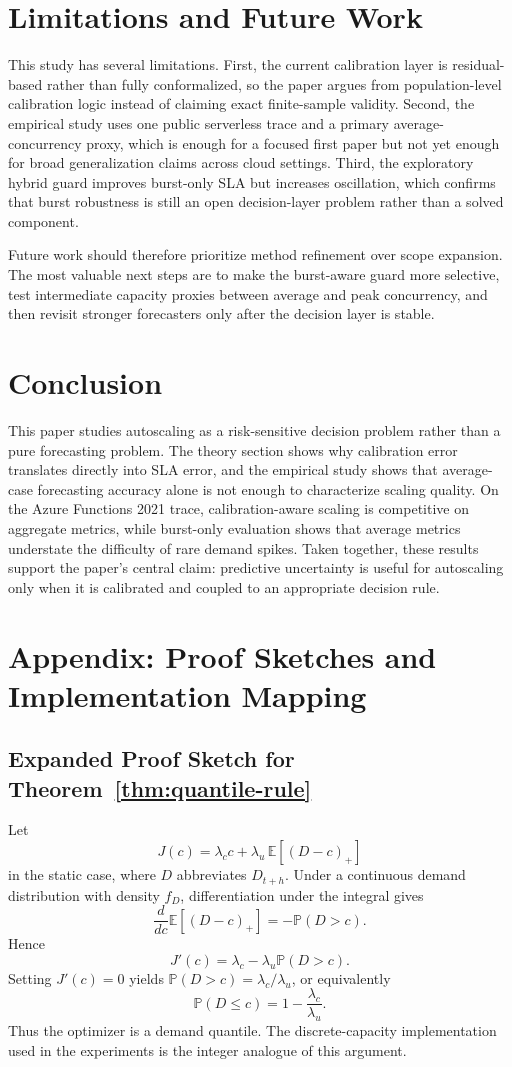 \documentclass[11pt]{article}
\theoremstyle{plain}
\theoremstyle{definition}
\theoremstyle{remark}
\begin{document}
\section{Limitations and Future Work}
This study has several limitations. First, the current calibration layer is residual-based rather than fully conformalized, so the paper argues from population-level calibration logic instead of claiming exact finite-sample validity. Second, the empirical study uses one public serverless trace and a primary average-concurrency proxy, which is enough for a focused first paper but not yet enough for broad generalization claims across cloud settings. Third, the exploratory hybrid guard improves burst-only SLA but increases oscillation, which confirms that burst robustness is still an open decision-layer problem rather than a solved component.

Future work should therefore prioritize method refinement over scope expansion. The most valuable next steps are to make the burst-aware guard more selective, test intermediate capacity proxies between average and peak concurrency, and then revisit stronger forecasters only after the decision layer is stable.

\section{Conclusion}
This paper studies autoscaling as a risk-sensitive decision problem rather than a pure forecasting problem. The theory section shows why calibration error translates directly into SLA error, and the empirical study shows that average-case forecasting accuracy alone is not enough to characterize scaling quality. On the Azure Functions 2021 trace, calibration-aware scaling is competitive on aggregate metrics, while burst-only evaluation shows that average metrics understate the difficulty of rare demand spikes. Taken together, these results support the paper's central claim: predictive uncertainty is useful for autoscaling only when it is calibrated and coupled to an appropriate decision rule.

\appendix
\section{Appendix: Proof Sketches and Implementation Mapping}
\subsection{Expanded Proof Sketch for Theorem~\ref{thm:quantile-rule}}
Let
\[
J(c) = \lambda_c c + \lambda_u \, \mathbb{E}[(D-c)_+]
\]
in the static case, where $D$ abbreviates $D_{t+h}$. Under a continuous demand distribution with density $f_D$, differentiation under the integral gives
\[
\frac{d}{dc}\mathbb{E}[(D-c)_+] = -\mathbb{P}(D>c).
\]
Hence
\[
J'(c)=\lambda_c-\lambda_u \mathbb{P}(D>c).
\]
Setting $J'(c)=0$ yields $\mathbb{P}(D>c)=\lambda_c/\lambda_u$, or equivalently
\[
\mathbb{P}(D \le c)=1-\frac{\lambda_c}{\lambda_u}.
\]
Thus the optimizer is a demand quantile. The discrete-capacity implementation used in the experiments is the integer analogue of this argument.
\end{document}
